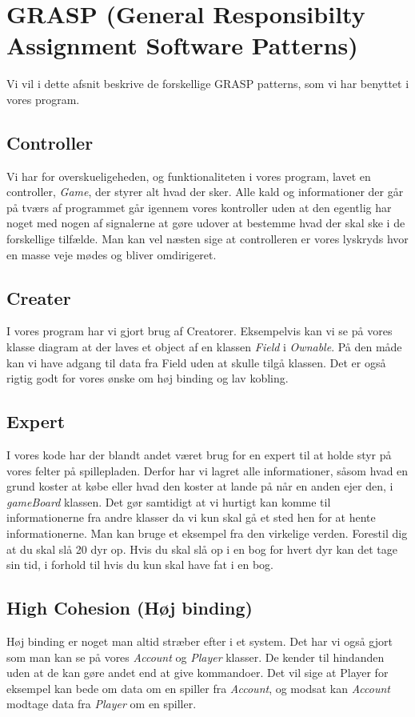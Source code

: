 \section{GRASP (General Responsibilty Assignment Software Patterns)}
Vi vil i dette afsnit beskrive de forskellige GRASP patterns, som vi har benyttet i vores program.
\subsection{Controller}
Vi har for overskueligeheden, og funktionaliteten i vores program, lavet en controller, \textit{Game}, der styrer alt hvad der sker. Alle kald og informationer der går på tværs af programmet går igennem vores kontroller uden at den egentlig har noget med nogen af signalerne at gøre udover at bestemme hvad der skal ske i de forskellige tilfælde. Man kan vel næsten sige at controlleren er vores lyskryds hvor en masse veje mødes og bliver omdirigeret.  
\subsection{Creater}
I vores program har vi gjort brug af Creatorer. Eksempelvis kan vi se på vores klasse diagram at der laves et object af en klassen \textit{Field} i \textit{Ownable}. På den måde kan vi have adgang til data fra Field uden at skulle tilgå klassen. Det er også rigtig godt for vores ønske om høj binding og lav kobling. 
\subsection{Expert}
I vores kode har der blandt andet været brug for en expert til at holde styr på vores felter på spillepladen. Derfor har vi lagret alle informationer, såsom hvad en grund koster at købe eller hvad den koster at lande på når en anden ejer den, i \textit{gameBoard} klassen. Det gør samtidigt at vi hurtigt kan komme til informationerne fra andre klasser da vi kun skal gå et sted hen for at hente informationerne. 
Man kan bruge et eksempel fra den virkelige verden. Forestil dig at du skal slå 20 dyr op. Hvis du skal slå op i en bog for hvert dyr kan det tage sin tid, i forhold til hvis du kun skal have fat i en bog.
\subsection{High Cohesion (Høj binding)}
Høj binding er noget man altid stræber efter i et system. Det har vi også gjort som man kan se på vores \textit{Account} og \textit{Player} klasser. De kender til hindanden uden at de kan gøre andet end at give kommandoer. Det vil sige at Player for eksempel kan bede om data om en spiller fra \textit{Account}, og modsat kan \textit{Account} modtage data fra \textit{Player} om en spiller. 
